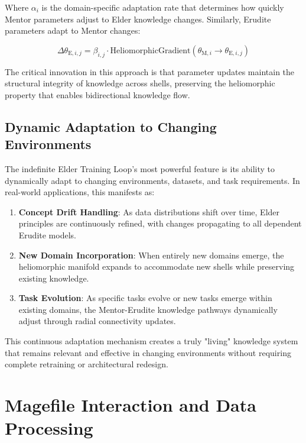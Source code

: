 Where $\alpha_i$ is the domain-specific adaptation rate that determines how quickly Mentor parameters adjust to Elder knowledge changes. Similarly, Erudite parameters adapt to Mentor changes:

\begin{equation}
\Delta \theta_{\text{E},i,j} = \beta_{i,j} \cdot \text{HeliomorphicGradient}(\theta_{\text{M},i} \rightarrow \theta_{\text{E},i,j})
\end{equation}

The critical innovation in this approach is that parameter updates maintain the structural integrity of knowledge across shells, preserving the heliomorphic property that enables bidirectional knowledge flow.

\subsection{Dynamic Adaptation to Changing Environments}

The indefinite Elder Training Loop's most powerful feature is its ability to dynamically adapt to changing environments, datasets, and task requirements. In real-world applications, this manifests as:

\begin{enumerate}
    \item \textbf{Concept Drift Handling}: As data distributions shift over time, Elder principles are continuously refined, with changes propagating to all dependent Erudite models.
    
    \item \textbf{New Domain Incorporation}: When entirely new domains emerge, the heliomorphic manifold expands to accommodate new shells while preserving existing knowledge.
    
    \item \textbf{Task Evolution}: As specific tasks evolve or new tasks emerge within existing domains, the Mentor-Erudite knowledge pathways dynamically adjust through radial connectivity updates.
\end{enumerate}

This continuous adaptation mechanism creates a truly "living" knowledge system that remains relevant and effective in changing environments without requiring complete retraining or architectural redesign.

\section{Magefile Interaction and Data Processing}

